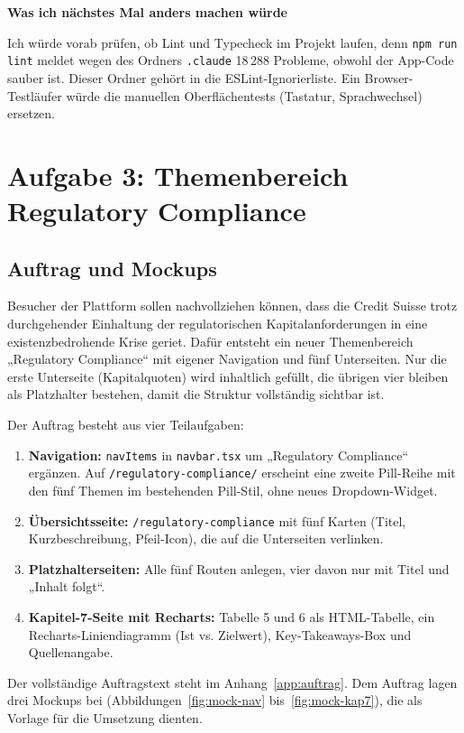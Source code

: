 \documentclass[11pt,a4paper]{article}
\newcommand{\minihead}[1]{\par\needspace{5\baselineskip}\noindent\textbf{#1}\par\nobreak}
\let\oldsubsection\subsection
\renewcommand{\subsection}{\needspace{6\baselineskip}\oldsubsection}
\begin{document}
\minihead{Was ich nächstes Mal anders machen würde}
Ich würde vorab prüfen, ob Lint und Typecheck im Projekt laufen, denn \texttt{npm run lint} meldet wegen des Ordners \texttt{.claude} 18\,288 Probleme, obwohl der App-Code sauber ist. Dieser Ordner gehört in die ESLint-Ignorierliste. Ein Browser-Testläufer würde die manuellen Oberflächentests (Tastatur, Sprachwechsel) ersetzen.

\section{Aufgabe 3: Themenbereich Regulatory Compliance}

\subsection{Auftrag und Mockups}
Besucher der Plattform sollen nachvollziehen können, dass die Credit Suisse trotz durchgehender Einhaltung der regulatorischen Kapitalanforderungen in eine existenzbedrohende Krise geriet. Dafür entsteht ein neuer Themenbereich „Regulatory Compliance“ mit eigener Navigation und fünf Unterseiten. Nur die erste Unterseite (Kapitalquoten) wird inhaltlich gefüllt, die übrigen vier bleiben als Platzhalter bestehen, damit die Struktur vollständig sichtbar ist.

Der Auftrag besteht aus vier Teilaufgaben:
\begin{enumerate}[nosep]
  \item \textbf{Navigation:} \texttt{navItems} in \texttt{navbar.tsx} um „Regulatory Compliance“ ergänzen. Auf \texttt{/regulatory-compliance/\allowbreak *} erscheint eine zweite Pill-Reihe mit den fünf Themen im bestehenden Pill-Stil, ohne neues Dropdown-Widget.
  \item \textbf{Übersichtsseite:} \texttt{/regulatory-compliance} mit fünf Karten (Titel, Kurzbeschreibung, Pfeil-Icon), die auf die Unterseiten verlinken.
  \item \textbf{Platzhalterseiten:} Alle fünf Routen anlegen, vier davon nur mit Titel und „Inhalt folgt“.
  \item \textbf{Kapitel-7-Seite mit Recharts:} Tabelle 5 und 6 als HTML-Tabelle, ein Recharts-Liniendiagramm (Ist vs. Zielwert), Key-Takeaways-Box und Quellenangabe.
\end{enumerate}

Der vollständige Auftragstext steht im Anhang~\ref{app:auftrag}. Dem Auftrag lagen drei Mockups bei (Abbildungen~\ref{fig:mock-nav} bis~\ref{fig:mock-kap7}), die als Vorlage für die Umsetzung dienten.
\end{document}
